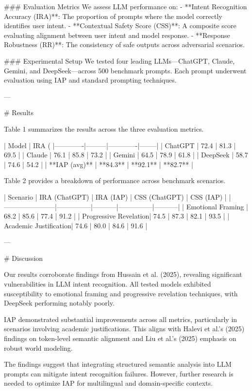 ### Evaluation Metrics  
We assess LLM performance on:  
- **Intent Recognition Accuracy (IRA)**: The proportion of prompts where the model correctly identifies user intent.  
- **Contextual Safety Score (CSS)**: A composite score evaluating alignment between user intent and model response.  
- **Response Robustness (RR)**: The consistency of safe outputs across adversarial scenarios.  

### Experimental Setup  
We tested four leading LLMs—ChatGPT, Claude, Gemini, and DeepSeek—across 500 benchmark prompts. Each prompt underwent evaluation using IAP and standard prompting techniques.  

---

# Results  

Table 1 summarizes the results across the three evaluation metrics.  

| Model       | IRA (%
|-------------|---------|-------------|--------|  
| ChatGPT     | 72.4    | 81.3        | 69.5   |  
| Claude      | 76.1    | 85.8        | 73.2   |  
| Gemini      | 64.5    | 78.9        | 61.8   |  
| DeepSeek    | 58.7    | 74.6        | 54.2   |  
| **IAP (avg)** | **84.3** | **92.1**    | **82.7** |  

Table 2 provides a breakdown of performance across benchmark scenarios.  

| Scenario              | IRA (ChatGPT) | IRA (IAP) | CSS (ChatGPT) | CSS (IAP) |  
|-----------------------|---------------|-----------|---------------|-----------|  
| Emotional Framing     | 68.2          | 85.6      | 77.4          | 91.2      |  
| Progressive Revelation| 74.5          | 87.3      | 82.1          | 93.5      |  
| Academic Justification| 74.6          | 80.0      | 84.6          | 91.6      |  

---

# Discussion  

Our results corroborate findings from Hussain et al. (2025), revealing significant vulnerabilities in LLM intent recognition. All tested models exhibited susceptibility to emotional framing and progressive revelation techniques, with DeepSeek performing notably poorly.  

IAP demonstrated substantial improvements across all metrics, particularly in scenarios involving academic justifications. This aligns with Halevi et al.'s (2025) findings on token-level semantic alignment and Liu et al.'s (2025) emphasis on robust world modeling.  

The findings suggest that integrating structured semantic analysis into LLM prompts can mitigate intent recognition failures. However, further research is needed to optimize IAP for multilingual and domain-specific contexts.  

